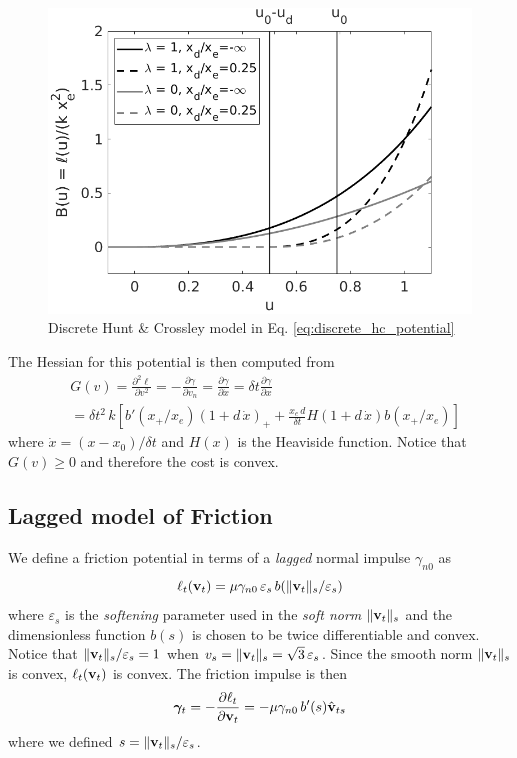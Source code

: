 \begin{figure}[!h]
    \centering
    \includegraphics[width=0.8\columnwidth]{figures/discrete_hc_potential.png}
    \caption{Discrete Hunt \& Crossley model in Eq. \eqref{eq:discrete_hc_potential}}
    \label{fig:discrete_hc_potential}
\end{figure}

The Hessian for this potential is then computed from
\begin{align}
    &G(v) = \frac{\partial^2\ell}{\partial v^2} = -\frac{\partial\gamma}{\partial
    v_n}=\frac{\partial\gamma}{\partial\dot{x}}=\delta t\frac{\partial\gamma}{\partial x}\\
    &=\delta t^2\,k
    \left[b'(x_+/x_e)(1+d\,\dot{x})_+  + \frac{x_e\,d}{\delta t} H(1+d\,\dot{x})b(x_+/x_e) \right]\nonumber
\end{align}
where $\dot{x} = (x-x_0)/\delta t$ and $H(x)$ is the Heaviside function. Notice
that $G(v) \ge 0$ and therefore the cost is convex.

\subsection{Lagged model of Friction}

We define a friction potential in terms of a \emph{lagged} normal impulse $\gamma_{n0}$ as
\begin{equation}
    \ell_t({\mathbf{v}}_t) = \mu\gamma_{n0}\,\varepsilon_s\,b(\Vert{\mathbf{v}}_t\Vert_s/\varepsilon_s)
\end{equation}
where $\varepsilon_s$ is the \emph{softening} parameter used in the \emph{soft
norm} $\Vert{\mathbf{v}}_t\Vert_s$ and the dimensionless function $b(s)$ is chosen to
be twice differentiable and convex. Notice that
$\Vert{\mathbf{v}}_t\Vert_s/\varepsilon_s = 1$ when $v_s = \Vert{\mathbf{v}}_t\Vert_s =
\sqrt{3}\,\varepsilon_s$. Since the smooth norm $\Vert{\mathbf{v}}_t\Vert_s$
is convex, $\ell_t({\mathbf{v}}_t)$ is convex. The friction impulse is then
\begin{equation}
    {\bm\gamma}_t = -\frac{\partial\ell_t}{\partial{\mathbf{v}}_t}=-\mu\gamma_{n0}\,b'(s)\hat{{\mathbf{v}}}_{ts}
\end{equation}
where we defined $s=\Vert{\mathbf{v}}_t\Vert_s/\varepsilon_s$.

